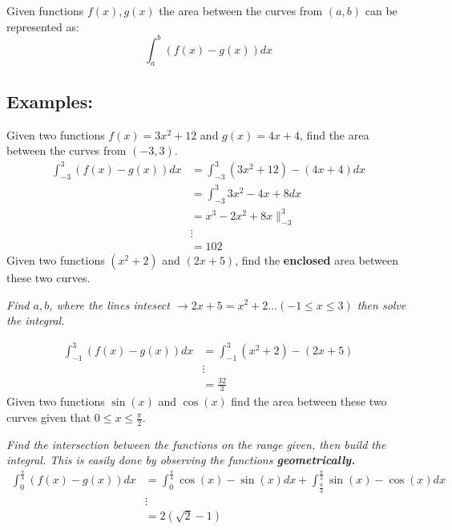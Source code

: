 \documentclass[a4paper]{article}
\begin{document}
  \begin{theorem}
    Given functions $f(x), g(x)$ the area between the curves from $(a,b)$ can be represented as:
    \begin{displaymath}
     \displaystyle\int_{a }^{b}  (f(x)-g(x))dx
    \end{displaymath}
  \end{theorem}
  \subsection{Examples:}
  Given two functions $f(x) = 3x^2 + 12$ and $g(x) = 4x+4$, find the area between the curves from $(-3,3)$.
  \begin{equation}
    \label{Example1}
    \begin{split}
      \displaystyle\int_{-3 }^{3 } (f(x)-g(x))dx &= \displaystyle\int_{-3 }^{3} (3x^2+12) - (4x+4) dx\\
                                               &= \displaystyle\int_{-3 }^{3} 3x^2 - 4x + 8 dx \\
                                               &= x^3-2x^2+8x \|^{3}_{-3} \\
                                               &\vdots\\
                                               &= 102
    \end{split}
  \end{equation}
  Given two functions $(x^2+2)$ and $(2x+5)$, find the \textbf{enclosed} area between these two curves.

 \textit{Find $a,b$, where the lines intesect $\rightarrow 2x+5 = x^2 + 2 \dots (-1 \le x \le 3)$ then solve the integral.} 

  \begin{equation}
    \label{eq:3}
    \begin{split}
      \displaystyle\int_{-1}^{3} (f(x)-g(x)) dx &= \displaystyle\int_{-1 }^{3 } (x^2 + 2)-(2x+5)\\
                                                &\vdots \\
                                                &= \frac{32 }{3}
    \end{split}
  \end{equation}
  Given two functions $\sin(x)$ and $\cos(x)$ find the area between these two curves given that $0\le x \le \frac{\pi }{2}$.
  
  \textit{Find the intersection between the functions on the range given, then build the integral. This is easily done by observing the functions \textbf{geometrically.}}
  \begin{equation}
    \begin{split}
      \displaystyle\int_{0 }^{\frac{\pi }{4}} (f(x)-g(x)) dx &= \displaystyle\int_{0 }^{\frac{\pi }{4}}\cos(x)-\sin(x)dx+\displaystyle\int_{\frac{\pi }{4}}^{\frac{\pi }{2}}\sin(x)-\cos(x)  dx \\ 
                                                             &\vdots\\
                                                             &= 2(\sqrt{2}-1)
    \end{split}
  \end{equation}
  \newpage
\end{document}
